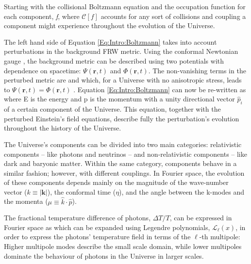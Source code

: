\qquad Starting with the collisional Boltzmann equation and the occupation function for each component, \textit{f}, 
where $\mathcal{C}[f]$ accounts for any sort of collisions and coupling a component might experience throughout the evolution of the Universe.

\qquad The left hand side of Equation \eqref{Eq:Intro:Boltzmann} takes into account perturbations in the background FRW metric. Using the conformal Newtonian gauge \citep{dods}, the background metric can be described using two potentials with dependence on spacetime: $\Psi (\textbf{r}, t)$ and $\Phi (\textbf{r}, t)$. The non-vanishing terms in the perturbed metric are
and 
which, for a Universe with no anisotropic stress, leads to $\Psi (\textbf{r},t) = \Phi(\textbf{r},t)$ \citep{Peacock}. Equation \eqref{Eq:Intro:Boltzmann} can now be re-written as
where E is the energy and p is the momentum with a unity directional vector $\hat{p}_i$ of a certain component of the Universe. This equation, together with the perturbed Einstein's field equations, describe fully the perturbation's evolution throughout the history of the Universe.

\qquad The Universe's components can be divided into two main categories: relativistic components -- like photons and neutrinos -- and non-relativistic components -- like dark and baryonic matter. Within the same category, components behave in a similar fashion; however, with different couplings. In Fourier space, the evolution of these components depends mainly on the magnitude of the wave-number vector ($k \equiv |\textbf{k}|$), the conformal time ($\eta$), and the angle between the k-modes and the momenta ($\mu\equiv \hat{k} \cdot \hat{p}$). 

\qquad The fractional temperature difference of photons, $\Delta T/T$, can be expressed in Fourier space as
which can be expanded using Legendre polynomials, $\mathcal{L}_{\ell}(x)$, in order to express the photons' temperature field in terms of the $\ell$-th multipole:
Higher multipole modes describe the small scale domain, while lower multipoles dominate the behaviour of photons in the Universe in larger scales. 

